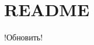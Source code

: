 \chapter{README}
\hypertarget{md__c_1_2_users_2_ponom_2_one_drive_2_desktop_2_aclo_py_2_alco_py_2_r_e_a_d_m_e}{}\label{md__c_1_2_users_2_ponom_2_one_drive_2_desktop_2_aclo_py_2_alco_py_2_r_e_a_d_m_e}
!Обновить! 